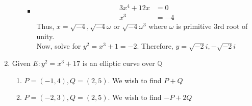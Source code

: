 \documentclass[oneside, 12pt, ]{article}
\newcommand{\QQ}{\mathbb Q}
\begin{document}
\begin{enumerate}
\begin{enumerate}
\begin{itemize}
\item \begin{align*}
3x^4 + 12x &= 0 \\
x^3 &= -4
\end{align*}
Thus, $x=\sqrt{-4}, \sqrt{-4} \omega $ or $\sqrt{-4}\omega^3$ where $\omega$ is primitive $3$rd root of unity. \\
Now, solve for $y^2 = x^3 + 1 = -2$. Therefore, $y = \sqrt{-2} i , -\sqrt{-2} i$
\end{itemize}
\end{enumerate}

\item Given $E: y^2 =x^3 + 17$ is an elliptic curve over $\QQ$

\begin{enumerate}
\item $P = (-1,4), Q = (2,5)$. We wish to find $P + Q$

\item $P =(-2,3), Q = (2,5)$. We wish to find $-P + 2Q$ 
\end{enumerate} 
\end{enumerate}
\end{document}
